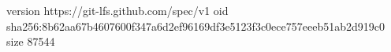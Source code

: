 version https://git-lfs.github.com/spec/v1
oid sha256:8b62aa67b4607600f347a6d2ef96169df3e5123f3c0ece757eeeb51ab2d919c0
size 87544
